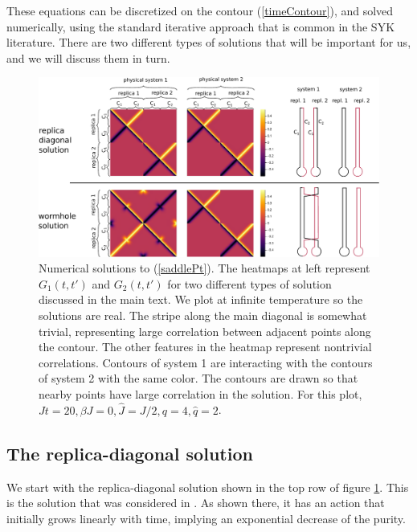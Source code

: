 \documentclass[12pt]{article}
\numberwithin{equation}{section}
\begin{document}
These equations can be discretized on the contour (\ref{timeContour}), and solved numerically, using the standard iterative approach that is common in the SYK literature. There are two different types of solutions that will be important for us, and we will discuss them in turn. 



	\begin{figure}[t]
\begin{center}
\includegraphics[width = \textwidth]{images/heatmapCombined.pdf}
\caption{{\small Numerical solutions to (\ref{saddlePt}). The heatmaps at left represent $G_1(t,t')$ and $G_2(t,t')$ for two different types of solution discussed in the main text. We plot at infinite temperature so the solutions are real. The stripe along the main diagonal is somewhat trivial, representing large correlation between adjacent points along the contour. The other features in the heatmap represent nontrivial correlations. Contours of system 1 are interacting with the contours of system 2 with the same color. The contours are drawn so that nearby points have large correlation in the solution. For this plot, $Jt = 20, \beta J = 0, \hat{J} = J/2, q = 4, \hat{q} = 2$.}}\label{figheatmap}
\end{center}
\end{figure}

\subsection{The replica-diagonal solution}
We start with the replica-diagonal solution shown in the top row of figure \ref{figheatmap}. This is the solution that was considered in \cite{Gu:2017njx}. As shown there, it has an action that initially grows linearly with time, implying an exponential decrease of the purity. 
\end{document}

